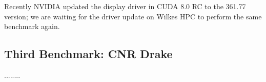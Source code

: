 \documentclass[conference]{IEEEtran}
\begin{document}
Recently NVIDIA updated the display driver in CUDA 8.0 RC to the 361.77 version; we are waiting for the driver update on Wilkes HPC to perform the same benchmark again.


\subsection{Third Benchmark: CNR Drake}

........

%
%



%
%
\end{document}
